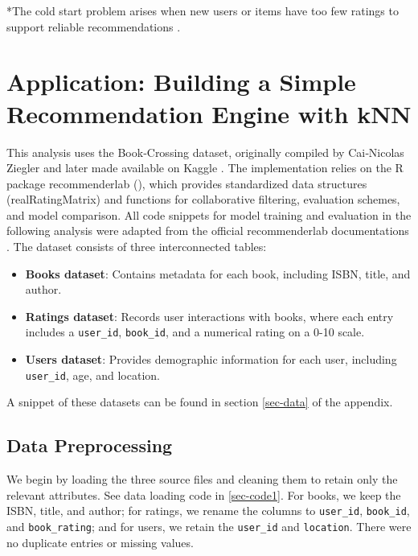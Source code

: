 \documentclass[
  12pt]{article}
\providecommand{\tightlist}{%
  \setlength{\itemsep}{0pt}\setlength{\parskip}{0pt}}
\begin{document}
*The cold start problem arises when new users or items have too few
ratings to support reliable recommendations \citep{apxml2025}.

\newpage

\section{\texorpdfstring{\textbf{Application: Building a Simple
Recommendation Engine with
kNN}}{Application: Building a Simple Recommendation Engine with kNN}}\label{application-building-a-simple-recommendation-engine-with-knn}

This analysis uses the Book‑Crossing dataset, originally compiled by
Cai‑Nicolas Ziegler and later made available on Kaggle \citep{bkaggle}.
The implementation relies on the R package recommenderlab
(\citet{recommenderlabdocs}), which provides standardized data
structures (realRatingMatrix) and functions for collaborative filtering,
evaluation schemes, and model comparison. All code snippets for model
training and evaluation in the following analysis were adapted from the
official recommenderlab documentations
\citep{recommenderlabdocs, recommenderlabdocs2025}. The dataset consists
of three interconnected tables:

\begin{itemize}
\tightlist
\item
  \textbf{Books dataset}: Contains metadata for each book, including
  ISBN, title, and author.
\item
  \textbf{Ratings dataset}: Records user interactions with books, where
  each entry includes a \texttt{user\_id}, \texttt{book\_id}, and a
  numerical rating on a 0-10 scale.
\item
  \textbf{Users dataset}: Provides demographic information for each
  user, including \texttt{user\_id}, age, and location.
\end{itemize}

A snippet of these datasets can be found in section \ref{sec-data} of
the appendix.

\subsection{\texorpdfstring{\textbf{Data
Preprocessing}}{Data Preprocessing}}\label{data-preprocessing}

We begin by loading the three source files and cleaning them to retain
only the relevant attributes. See data loading code in \ref{sec-code1}.
For books, we keep the ISBN, title, and author; for ratings, we rename
the columns to \texttt{user\_id}, \texttt{book\_id}, and
\texttt{book\_rating}; and for users, we retain the \texttt{user\_id}
and \texttt{location}. There were no duplicate entries or missing
values.
\end{document}
